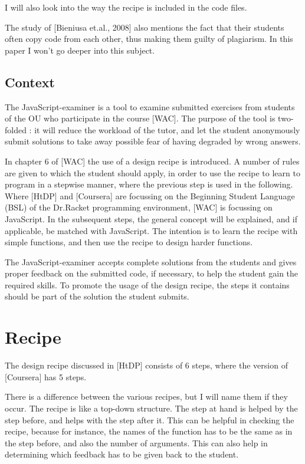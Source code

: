 \documentclass{article}
\begin{document}
I will also look into the way the recipe is included in the code files.

The study of [Bieniusa et.al., 2008] also mentions the fact that their students often copy code from
each other, thus making them guilty of plagiarism.
In this paper I won't go deeper into this subject.


\subsection{Context}

The JavaScript-examiner is a tool to examine submitted exercises from students
of the OU who participate in the course [WAC].
The purpose of the tool is two-folded : it will  reduce the workload of the
tutor, and let the student anonymously submit solutions to take away possible
fear of having degraded by wrong answers.

In chapter 6 of [WAC] the use of a design recipe is introduced. A number of rules
are given to which the student should apply, in order to use the recipe to learn
to program in a stepwise manner, where the previous step is used in the following.
Where [HtDP] and [Coursera] are focussing on the Beginning Student Language
(BSL) of the Dr.Racket programming environment, [WAC] is focussing on JavaScript.
In the subsequent steps, the general concept will be explained, and if applicable,
be matched with JavaScript.
The intention is to learn the recipe with simple functions, and then use the
recipe to design harder functions.

The JavaScript-examiner accepts complete solutions from the students and gives proper
feedback on the submitted code, if necessary, to help the student gain the
required skills. To promote the usage of the design recipe, the steps it contains
should be part of the solution the student submits.


\section{Recipe}
The design recipe discussed in [HtDP] consists of 6 steps, where the version of
[Coursera] has 5 steps.

There is a difference between the various recipes, but I will name them if they occur.
The recipe is like a top-down structure. The step at hand is helped by the step
before, and helps with the step after it.
This can be helpful in checking the recipe, because for instance, the names of
the function has to be the same as in the step before, and also the number of
arguments. This can also help in determining which feedback has to be given back
to the student.
\end{document}
